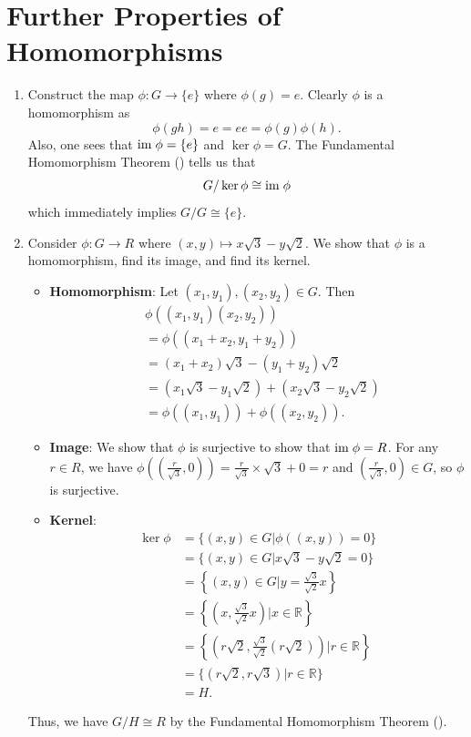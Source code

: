 \section{Further Properties of Homomorphisms}
\begin{enumerate}
    \item Construct the map $\phi: G \to \{e\}$ where $\phi(g) = e$. Clearly $\phi$ is a homomorphism as
    \[
        \phi(gh) = e = ee = \phi(g)\phi(h).
    \]
    Also, one sees that $\mathrm{im}\;\phi = \{e\}$ and $\ker\phi = G$. The Fundamental Homomorphism Theorem () tells us that
    \[
        G / \ker\phi \cong \mathrm{im}\;\phi
    \]
    which immediately implies $G/G \cong \{e\}$.

    \item Consider $\phi: G \to R$ where $(x, y) \mapsto x\sqrt3 - y\sqrt2$. We show that $\phi$ is a homomorphism, find its image, and find its kernel.
    \begin{itemize}
        \item \textbf{Homomorphism}: Let $(x_1, y_1), (x_2, y_2) \in G$. Then
        \begin{align*}
            &\phi((x_1,y_1)(x_2,y_2))\\
            &= \phi((x_1+x_2,y_1+y_2))\\
            &= (x_1+x_2)\sqrt3 - (y_1+y_2)\sqrt2\\
            &= (x_1\sqrt3 - y_1\sqrt2) + (x_2\sqrt3 - y_2\sqrt2)\\
            &= \phi((x_1, y_1)) + \phi((x_2, y_2)).
        \end{align*}

        \item \textbf{Image}: We show that $\phi$ is surjective to show that $\mathrm{im}\;\phi = R$. For any $r \in R$, we have $\phi((\frac{r}{\sqrt3}, 0)) = \frac{r}{\sqrt3} \times \sqrt3 + 0 = r$ and $(\frac{r}{\sqrt3}, 0) \in G$, so $\phi$ is surjective.
        
        \item \textbf{Kernel}: 
        \begin{align*}
            \ker\phi &= \{(x, y) \in G \vert \phi((x, y)) = 0\}\\
            &= \{(x, y) \in G \vert x\sqrt3-y\sqrt2 = 0\}\\
            &= \left\{(x, y) \in G \vert y = \frac{\sqrt{3}}{\sqrt{2}}x\right\}\\
            &= \left\{(x, \frac{\sqrt{3}}{\sqrt{2}}x) \vert x \in \mathbb{R}\right\}\\
            &= \left\{(r\sqrt2, \frac{\sqrt{3}}{\sqrt{2}}(r\sqrt2)) \vert r \in \mathbb{R}\right\}\\
            &= \{(r\sqrt2, r\sqrt3) \vert r \in \mathbb{R}\}\\
            &= H.
        \end{align*}
    \end{itemize}
    Thus, we have $G / H \cong R$ by the Fundamental Homomorphism Theorem ().


\end{enumerate}
